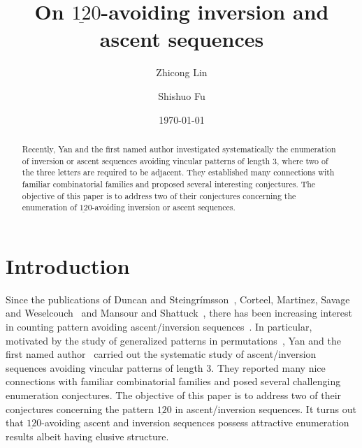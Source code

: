 \documentclass[12pt,A4]{amsart}
\numberwithin{equation}{section}
\theoremstyle{plain}
\theoremstyle{definition}
\begin{document}
\title[Patterns in inversion sequences]{On $\underline{12}0$-avoiding inversion and ascent sequences}



\author[Z. Lin]{Zhicong Lin}
\address[Zhicong Lin]{Research Center for Mathematics and Interdisciplinary Sciences, Shandong University, Qingdao 266237, P.R. China}

\author[S. Fu]{Shishuo Fu}
\address[Shishuo Fu]{College of Mathematics and Statistics, Chongqing University, Huxi campus, Chongqing 401331, P.R. China}







\date{\today}




\begin{abstract}
Recently, Yan and the first named author investigated systematically the enumeration of inversion or ascent sequences avoiding vincular patterns of length $3$, where two of the three letters are required to be adjacent. They established many connections with familiar combinatorial families and proposed several interesting conjectures. The objective of this paper is to address two of their conjectures concerning the enumeration of $\underline{12}0$-avoiding inversion or ascent sequences.
\end{abstract}



\maketitle

\section{Introduction}

Since the publications of Duncan and Steingr\'imsson~\cite{ds}, Corteel, Martinez, Savage and Weselcouch~\cite{cor} and Mansour and Shattuck~\cite{mash}, there has been increasing interest in counting pattern avoiding ascent/inversion sequences~\cite{auli,auli2,bp,bbgr,bgrr,cjl,cddds,kl,kl2,lin,lin2,ly,ms,yan0,yan}. In particular, motivated by the study of generalized patterns in permutations~\cite{bas,cla}, Yan and the first named author~\cite{ly} carried out the systematic study of ascent/inversion sequences avoiding vincular patterns of length $3$. They reported many nice connections with familiar combinatorial families and posed several challenging enumeration conjectures. The objective of this paper is to address two of their conjectures concerning the pattern $\underline{12}0$ in  ascent/inversion sequences. It turns out that  $\underline{12}0$-avoiding ascent and inversion sequences possess attractive enumeration results albeit having elusive structure.
\end{document}
